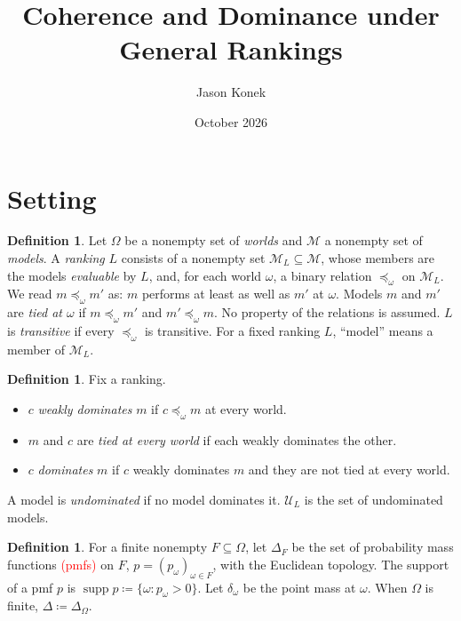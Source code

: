 \documentclass[11pt]{article}
\title{Coherence and Dominance under General Rankings}
\author{Jason Konek}
\date{October 2026}
\theoremstyle{definition}
\newtheorem{definition}[theorem]{Definition}
\newcommand{\M}{\mathcal M}
\newcommand{\U}{\mathcal U}
\newcommand{\supp}{\operatorname{supp}}
\newcommand{\new}[1]{\textcolor{red}{#1}}
\begin{document}
\maketitle

\begin{abstract}
\end{abstract}

\section{Setting}\label{sec:setting}

\begin{definition}\label{def:rankings}
Let $\Omega$ be a nonempty set of \emph{worlds} and $\M$ a nonempty set of \emph{models}. A \emph{ranking} $L$ consists of a nonempty set $\M_L\subseteq\M$, whose members are the models \emph{evaluable} by $L$, and, for each world $\omega$, a binary relation $\preceq_\omega$ on $\M_L$. We read $m\preceq_\omega m'$ as: $m$ performs at least as well as $m'$ at $\omega$. Models $m$ and $m'$ are \emph{tied at $\omega$} if $m\preceq_\omega m'$ and $m'\preceq_\omega m$. No property of the relations is assumed. $L$ is \emph{transitive} if every $\preceq_\omega$ is transitive. For a fixed ranking $L$, ``model'' means a member of $\M_L$.
\end{definition}

\begin{definition}\label{def:dominance}
Fix a ranking.
\begin{itemize}[leftmargin=*]
\item $c$ \emph{weakly dominates} $m$ if $c\preceq_\omega m$ at every world.
\item $m$ and $c$ are \emph{tied at every world} if each weakly dominates the other.
\item $c$ \emph{dominates} $m$ if $c$ weakly dominates $m$ and they are not tied at every world.
\end{itemize}
A model is \emph{undominated} if no model dominates it. $\U_L$ is the set of undominated models.
\end{definition}

\begin{definition}\label{def:priors}
For a finite nonempty $F\subseteq\Omega$, let $\Delta_F$ be the set of probability mass functions \new{(pmfs)} on $F$, $p=(p_\omega)_{\omega\in F}$, with the Euclidean topology. The support of a pmf $p$ is $\supp p\coloneqq\{\omega:p_\omega>0\}$. Let $\delta_\omega$ be the point mass at $\omega$. When $\Omega$ is finite, $\Delta\coloneqq\Delta_\Omega$.
\end{definition}
\end{document}
